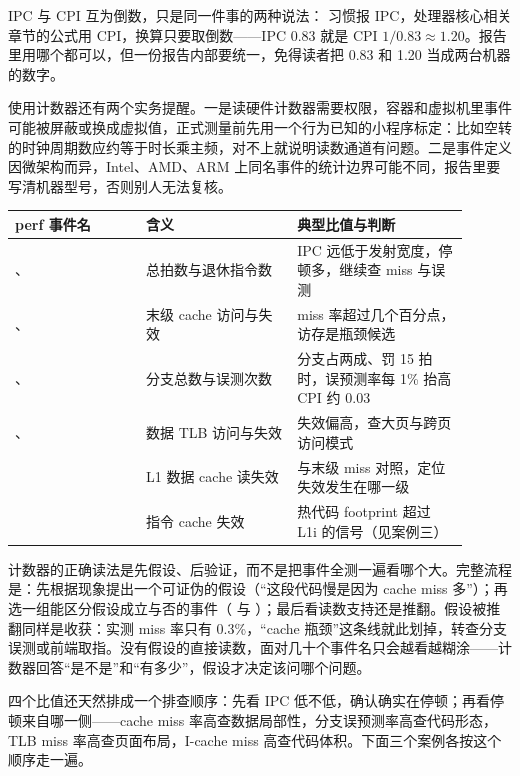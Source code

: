 IPC 与 CPI 互为倒数，只是同一件事的两种说法： 习惯报 IPC，处理器核心相关章节的公式用 CPI，换算只要取倒数——IPC 0.83 就是 CPI $1/0.83\approx1.20$。报告里用哪个都可以，但一份报告内部要统一，免得读者把 0.83 和 1.20 当成两台机器的数字。

使用计数器还有两个实务提醒。一是读硬件计数器需要权限，容器和虚拟机里事件可能被屏蔽或换成虚拟值，正式测量前先用一个行为已知的小程序标定：比如空转的时钟周期数应约等于时长乘主频，对不上就说明读数通道有问题。二是事件定义因微架构而异，Intel、AMD、ARM 上同名事件的统计边界可能不同，报告里要写清机器型号，否则别人无法复核。

\begin{longtable}{L{0.26\linewidth}L{0.30\linewidth}L{0.34\linewidth}}
\toprule
perf 事件名 & 含义 & 典型比值与判断 \\
\midrule
{}、 & 总拍数与退休指令数 & IPC 远低于发射宽度，停顿多，继续查 miss 与误测 \\\tablerowrule
{}、 & 末级 cache 访问与失效 & miss 率超过几个百分点，访存是瓶颈候选 \\\tablerowrule
{}、 & 分支总数与误测次数 & 分支占两成、罚 15 拍时，误预测率每 1\% 抬高 CPI 约 0.03 \\\tablerowrule
{}、 & 数据 TLB 访问与失效 & 失效偏高，查大页与跨页访问模式 \\\tablerowrule
{} & L1 数据 cache 读失效 & 与末级 miss 对照，定位失效发生在哪一级 \\\tablerowrule
{} & 指令 cache 失效 & 热代码 footprint 超过 L1i 的信号（见案例三） \\
\bottomrule
\end{longtable}

计数器的正确读法是先假设、后验证，而不是把事件全测一遍看哪个大。完整流程是：先根据现象提出一个可证伪的假设（“这段代码慢是因为 cache miss 多”）；再选一组能区分假设成立与否的事件（ 与 ）；最后看读数支持还是推翻。假设被推翻同样是收获：实测 miss 率只有 0.3\%，“cache 瓶颈”这条线就此划掉，转查分支误测或前端取指。没有假设的直接读数，面对几十个事件名只会越看越糊涂——计数器回答“是不是”和“有多少”，假设才决定该问哪个问题。

四个比值还天然排成一个排查顺序：先看 IPC 低不低，确认确实在停顿；再看停顿来自哪一侧——cache miss 率高查数据局部性，分支误预测率高查代码形态，TLB miss 率高查页面布局，I-cache miss 高查代码体积。下面三个案例各按这个顺序走一遍。


